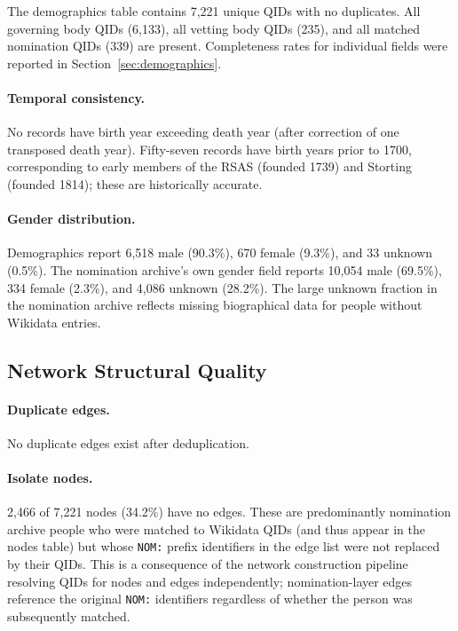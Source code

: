 The demographics table contains 7{,}221 unique QIDs with no duplicates.
All governing body QIDs (6{,}133), all vetting body QIDs (235), and all
matched nomination QIDs (339) are present. Completeness rates for individual
fields were reported in Section~\ref{sec:demographics}.

\paragraph{Temporal consistency.} No records have birth year exceeding
death year (after correction of one transposed death year). Fifty-seven
records have birth years prior to 1700, corresponding to early members
of the RSAS (founded 1739) and Storting (founded 1814); these are
historically accurate.

\paragraph{Gender distribution.} Demographics report 6{,}518 male (90.3\%),
670 female (9.3\%), and 33 unknown (0.5\%). The nomination archive's own
gender field reports 10{,}054 male (69.5\%), 334 female (2.3\%), and 4{,}086
unknown (28.2\%). The large unknown fraction in the nomination archive
reflects missing biographical data for people without Wikidata entries.

\subsection{Network Structural Quality}

\paragraph{Duplicate edges.} No duplicate edges exist after deduplication.

\paragraph{Isolate nodes.} 2{,}466 of 7{,}221 nodes (34.2\%) have no
edges. These are predominantly nomination archive people who were matched
to Wikidata QIDs (and thus appear in the nodes table) but whose
\texttt{NOM:} prefix identifiers in the edge list were not replaced by
their QIDs. This is a consequence of the network construction pipeline
resolving QIDs for nodes and edges independently; nomination-layer edges
reference the original \texttt{NOM:} identifiers regardless of whether
the person was subsequently matched.

